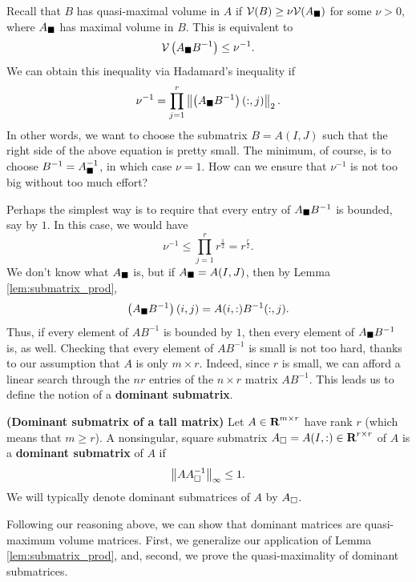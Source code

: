 \documentclass{article}
\begin{document}
	Recall that $B$ has quasi-maximal volume in $A$ if $\mathcal{V}(B) \ge \nu \mathcal{V}(A_\blacksquare)$ for some $\nu > 0$, where $A_\blacksquare$ has maximal volume in $B$. This is equivalent to
	\begin{equation}
		\mathcal{V}\left(A_\blacksquare B^{-1}\right) \le \nu^{-1}.
	\end{equation}
	We can obtain this inequality via Hadamard's inequality if
	\begin{equation}
		\nu^{-1} = \prod_{j=1}^r \left\lVert \left(A_\blacksquare B^{-1}\right)(:,j) \right\rVert_2.
	\end{equation}
	In other words, we want to choose the submatrix $B = A(I,J)$ such that the right side of the above equation is pretty small. The minimum, of course, is to choose $B^{-1} = A_\blacksquare^{-1}$, in which case $\nu = 1$. How can we ensure that $\nu^{-1}$ is not too big without too much effort?
	
	Perhaps the simplest way is to require that every entry of  $A_\blacksquare B^{-1}$ is bounded, say by $1$. In this case, we would have
	\begin{equation}
		\nu^{-1} \le \prod_{j=1}^r r^{\frac{1}{2}} = r^\frac{r}{2}.
	\end{equation}
	We don't know what $A_\blacksquare$ is, but if $A_\blacksquare = A(I,J)$, then by Lemma \ref{lem:submatrix_prod},
	\begin{equation}
		\left(A_\blacksquare B^{-1}\right)(i,j) = A(i,:)B^{-1}(:,j).
	\end{equation}
	Thus, if every element of $AB^{-1}$ is bounded by $1$, then every element of $A_\blacksquare B^{-1}$ is, as well. Checking that every element of $AB^{-1}$ is small is not too hard, thanks to our assumption that $A$ is only $m\times r$. Indeed, since $r$ is small, we can afford a linear search through the $nr$ entries of the $n\times r$ matrix $AB^{-1}$. This leads us to define the notion of a \textbf{dominant submatrix}.
	\begin{dfn} \textnormal{\bf(Dominant submatrix of a tall matrix)}
		\label{def:dominant_submatrix}
		Let $A \in \textnormal{\bf R}^{m\times r}$ have rank $r$ (which means that $m \ge r$). A nonsingular, square submatrix $A_\square = A(I,:) \in \textnormal{\bf R}^{r\times r}$ of $A$ is a \textbf{dominant submatrix} of $A$ if
		\begin{equation}
			\left\lVert AA_{\square}^{-1} \right\rVert_\infty \le 1.
		\end{equation}
		We will typically denote dominant submatrices of $A$ by $A_\square$.
	\end{dfn}
	
	Following our reasoning above, we can show that dominant matrices are quasi-maximum volume matrices. First, we generalize our application of Lemma \ref{lem:submatrix_prod}, and, second, we prove the quasi-maximality of dominant submatrices.
	
\end{document}
